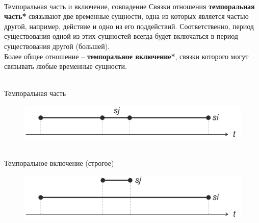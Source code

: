 \begin{frame}{\\Темпоральная часть и включение, совпадение}
	\topline
	\justifying
	Связки отношения \textbf{темпоральная часть*} связывают две временные сущности, одна из которых является частью	другой, например, действие и одно из его поддействий. Соответственно, период существования одной из этих сущностей всегда будет включаться в период существования другой (большей).\\
	Более общее отношение -- \textbf{темпоральное включение*}, связки которого могут связывать любые временные сущности.
\end{frame}

\begin{frame}{\\Темпоральная часть}
	\topline
	\justifying
	\vspace{10mm}
	\begin{SCn}
		\begin{figure}[H]
			\includegraphics[scale=0.6]{./figures/sd_temp_entities/img_temporal_part.png}
		\end{figure}
	\end{SCn}
\end{frame}

\begin{frame}{\\Темпоральное включение (строгое)}
	\topline
	\justifying
	\vspace{10mm}
	\begin{SCn}
		\begin{figure}[H]
			\includegraphics[scale=0.6]{./figures/sd_temp_entities/img_strict_temporal_inclusion.png}
		\end{figure}
	\end{SCn}
\end{frame}

